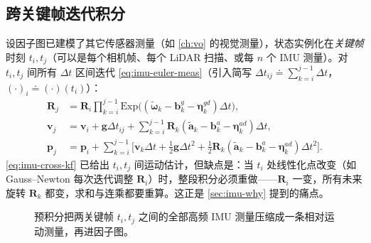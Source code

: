 \subsection{跨关键帧迭代积分}
\label{subsec:cross-kf}

设因子图已建模了其它传感器测量（如 \cref{ch:vo} 的视觉测量），状态实例化在\emph{关键帧}时刻 $t_i,t_j$（可以是每个相机帧、每个 LiDAR 扫描、或每 $n$ 个 IMU 测量\cite{forster2017preintegration}）。对 $t_i,t_j$ 间所有 $\Delta t$ 区间迭代 \cref{eq:imu-euler-meas}（引入简写 $\Delta t_{ij}\doteq\sum_{k=i}^{j-1}\Delta t$，$(\cdot)_i\doteq(\cdot)(t_i)$）：
\begin{align}
  \mathbf R_j&=\mathbf R_i\prod_{k=i}^{j-1}\mathrm{Exp}\!\big((\tilde{\boldsymbol\omega}_k-\mathbf b_k^g-\boldsymbol\eta_k^{gd})\Delta t\big),\nonumber\\
  \mathbf v_j&=\mathbf v_i+\mathbf g\Delta t_{ij}+\sum_{k=i}^{j-1}\mathbf R_k(\tilde{\mathbf a}_k-\mathbf b_k^a-\boldsymbol\eta_k^{ad})\Delta t,\label{eq:imu-cross-kf}\\
  \mathbf p_j&=\mathbf p_i+\sum_{k=i}^{j-1}\Big[\mathbf v_k\Delta t+\tfrac12\mathbf g\Delta t^2+\tfrac12\mathbf R_k(\tilde{\mathbf a}_k-\mathbf b_k^a-\boldsymbol\eta_k^{ad})\Delta t^2\Big].\nonumber
\end{align}
\cref{eq:imu-cross-kf} 已给出 $t_i,t_j$ 间运动估计，但缺点是：当 $t_i$ 处线性化点改变（如 Gauss--Newton 每次迭代调整 $\mathbf R_i$）时，整段积分必须重做——$\mathbf R_i$ 一变，所有未来旋转 $\mathbf R_k$ 都变，求和与连乘都要重算\cite{forster2017preintegration}。这正是 \cref{sec:imu-why} 提到的痛点。

\begin{figure}[ht]
\centering
{}
\caption{预积分把两关键帧 $t_i,t_j$ 之间的全部高频 IMU 测量压缩成一条相对运动测量，再进因子图。}
\label{fig:imu-preint-timeline}
\end{figure}

